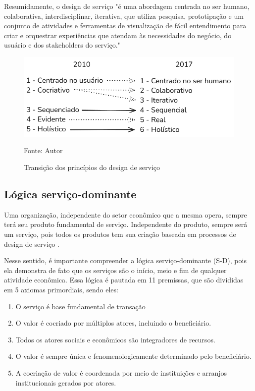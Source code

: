 Resumidamente, o design de serviço "é uma abordagem centrada no ser humano, colaborativa, interdisciplinar, iterativa, que utiliza pesquisa, prototipação e um conjunto de atividades e ferramentas de visualização de fácil entendimento para criar e orquestrar experiências que atendam às necessidades do negócio, do usuário e dos stakeholders do serviço."\cite{Stickdorn2019}

\begin{figure}[h]
	\centering %
	\includegraphics[width=17cm]{figuras/principios.png} %
	\caption{Transição dos princípios do design de serviço}
	Fonte: Autor
	\label{figura:qualquernome}
\end{figure}

\subsection{Lógica serviço-dominante}

Uma organização, independente do setor econômico que a mesma opera, sempre terá seu produto fundamental de serviço. Independente do produto, sempre será um serviço, pois todos os produtos tem sua criação baseada em processos de design de serviço \cite{Stickdorn2019}.

Nesse sentido, é importante compreender a lógica serviço-dominante (S-D), pois ela demonstra de fato que os serviços são o início, meio e fim de qualquer atividade econômica. Essa lógica é pautada em 11 premissas, que são divididas em 5 axiomas primordiais, sendo eles:

\begin{enumerate}
	\item O serviço é base fundamental de transação
	\item O valor é cocriado por múltiplos atores, incluindo o beneficiário.
	\item Todos os atores sociais e econômicos são integradores de recursos.
	\item O valor é sempre única e fenomenologicamente determinado pelo beneficiário.
	\item A cocriação de valor é coordenada por meio de instituições e arranjos institucionais gerados por atores. 
\end{enumerate}

